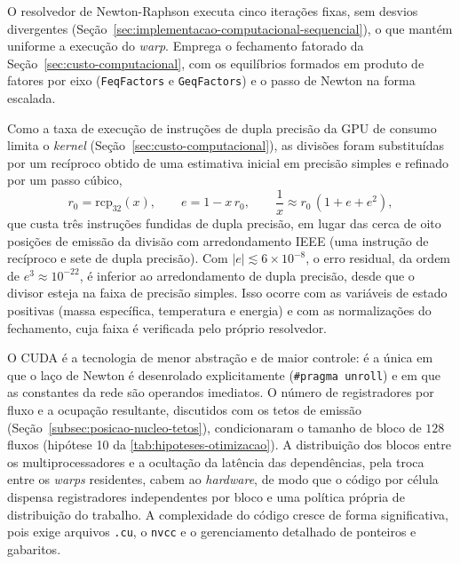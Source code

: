 O resolvedor de Newton-Raphson executa cinco iterações fixas, sem desvios divergentes (Seção~\ref{sec:implementacao-computacional-sequencial}), o que mantém uniforme a execução do \textit{warp}.
Emprega o fechamento fatorado da Seção~\ref{sec:custo-computacional}, com os equilíbrios formados em produto de fatores por eixo (\texttt{FeqFactors} e \texttt{GeqFactors}) e o passo de Newton na forma escalada.

Como a taxa de execução de instruções de dupla precisão da GPU de consumo limita o \textit{kernel} (Seção~\ref{sec:custo-computacional}), as divisões foram substituídas por um recíproco obtido de uma estimativa inicial em precisão simples e refinado por um passo cúbico,
\begin{equation}\label{eq:recip}
    r_0 = \mathrm{rcp}_{32}(x), \qquad e = 1 - x\, r_0, \qquad \frac{1}{x} \approx r_0\,(1 + e + e^2),
\end{equation}
que custa três instruções fundidas de dupla precisão, em lugar das cerca de oito posições de emissão da divisão com arredondamento IEEE (uma instrução de recíproco e sete de dupla precisão).
Com $|e| \lesssim 6 \times 10^{-8}$, o erro residual, da ordem de $e^3 \approx 10^{-22}$, é inferior ao arredondamento de dupla precisão, desde que o divisor esteja na faixa de precisão simples. %
Isso ocorre com as variáveis de estado positivas (massa específica, temperatura e energia) e com as normalizações do fechamento, cuja faixa é verificada pelo próprio resolvedor.

O CUDA é a tecnologia de menor abstração e de maior controle: é a única em que o laço de Newton é desenrolado explicitamente (\texttt{\#pragma unroll}) e em que as constantes da rede são operandos imediatos.
O número de registradores por fluxo e a ocupação resultante, discutidos com os tetos de emissão (Seção~\ref{subsec:posicao-nucleo-tetos}), condicionaram o tamanho de bloco de $128$ fluxos (hipótese 10 da \autoref{tab:hipoteses-otimizacao}).
A distribuição dos blocos entre os multiprocessadores e a ocultação da latência das dependências, pela troca entre os \textit{warps} residentes, cabem ao \textit{hardware}, de modo que o código por célula dispensa registradores independentes por bloco e uma política própria de distribuição do trabalho.
A complexidade do código cresce de forma significativa, pois exige arquivos \texttt{.cu}, o \texttt{nvcc} e o gerenciamento detalhado de ponteiros e gabaritos. %

